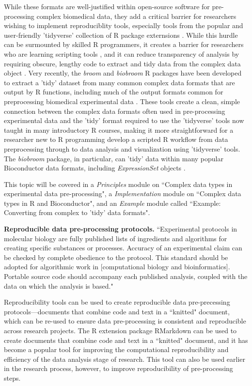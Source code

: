 \documentclass[pdftex,english,11pt,parskip=half]{scrartcl}
\begin{document}
While these formats are well-justified within open-source software for pre-processing complex biomedical data, they add a critical barrier for researchers wishing
to implement reproduciblity tools, especially tools from the popular and user-friendly 'tidyverse' collection of R package externsions \cite{robinson2014broom}. While this hurdle can be surmounted by skilled R programmers, it creates a barrier for researchers who are learning scripting tools \cite{robinson2014broom}, and it can reduce transparency of analysis by requiring obscure, lengthy code to extract and tidy data from the complex data object \cite{robinson2014broom}. Very recently, the \textit{broom} and \textit{biobroom} R packages have been developed 
to extract a 'tidy' dataset from many common complex data formats that are output by R functions, including much of the output formats common for preprocessing biomedical experimental data \cite{robinson2014broom, biobroom}.
These tools create a clean, simple connection between the complex data formats
often used in pre-processing experimental data and the 'tidy' format
required to use the 'tidyverse' tools now taught in many introductory R courses, making it more straightforward for a researcher new to R programming develop a scripted R workflow from data preprocessing through to data analysis and visualization using 'tidyverse' tools. The \textit{biobroom} package, in particular, can 'tidy' data within many popular Bioconductor data formats, including \textit{ExpressionSet} objects \cite{biobroom}.

This topic will be covered in a \textit{Principles} module on ``Complex data types in
experimental data pre-processing", a \textit{Implementation} module on ``Complex
data types in R and Bioconductor", and an \textit{Example} module called
``Example: Converting from complex to 'tidy' data formats".

\textbf{Reproducible data pre-processing protocols.} ``Experimental protocols in molecular biology are fully published lists of ingredients and algorithms for creating specific substances or processes. Accuracy of an experimental claim can be checked by complete obedience to the protocol. This standard should be adopted for algorithmic work in [computational biology and bioinformatics]. Portable source code should accompany each published analysis, coupled with the data on which the analysis is based." \cite{gentleman2004bioconductor}

Reproducibility tools can be used to create reproducible data pre-precessing protocols---documents that combine code and text in a ``knitted" document, which can be re-used to ensure data pre-processing is consistent and reproducible across research projects. The R extension package RMarkdown can be used to create documents that combine code and text in a 
``knitted" document, and it has become a popular tool 
for improving the computational reproducibility and 
efficiency of the data analysis stage of research. This tool can also be used earlier in the research process, however, to improve reproducibility of pre-processing steps. 
\end{document}
